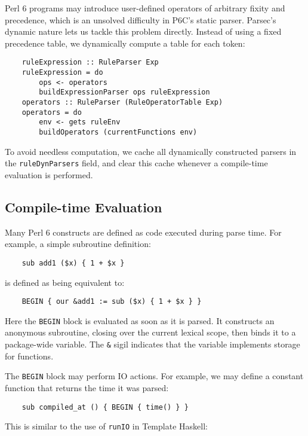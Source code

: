 \documentclass[]{sigplanconf}
\newcommand{\code}[1]{\texttt{#1}}
\begin{document}
Perl 6 programs may introduce user-defined operators of arbitrary fixity and
precedence, which is an unsolved difficulty in P6C's static parser.  Parsec's
dynamic nature lets us tackle this problem directly.  Instead of using a fixed
precedence table, we dynamically compute a table for each token:

\begin{lstlisting}
    ruleExpression :: RuleParser Exp
    ruleExpression = do
        ops <- operators
        buildExpressionParser ops ruleExpression
    operators :: RuleParser (RuleOperatorTable Exp)
    operators = do
        env <- gets ruleEnv
        buildOperators (currentFunctions env)
\end{lstlisting}

To avoid needless computation, we cache all dynamically constructed parsers in
the \code{ruleDynParsers} field, and clear this cache whenever a compile-time
evaluation is performed.

\subsection{Compile-time Evaluation}
\label{sec:Compile-timeEvaluation}

Many Perl 6 constructs are defined as code executed during parse time.
For example, a simple subroutine definition:

\begin{lstlisting}
    sub add1 ($x) { 1 + $x }
\end{lstlisting}

is defined as being equivalent to:

\begin{lstlisting}
    BEGIN { our &add1 := sub ($x) { 1 + $x } }
\end{lstlisting}

Here the \code{BEGIN} block is evaluated as soon as it is parsed.  It constructs
an anonymous subroutine, closing over the current lexical scope, then binds
it to a package-wide variable.  The \code{\&} sigil indicates that the variable
implements storage for functions.

The \code{BEGIN} block may perform IO actions.  For example, we may define a
constant function that returns the time it was parsed:

\begin{lstlisting}
    sub compiled_at () { BEGIN { time() } }
\end{lstlisting}

This is similar to the use of \code{runIO} in Template Haskell:
\end{document}
